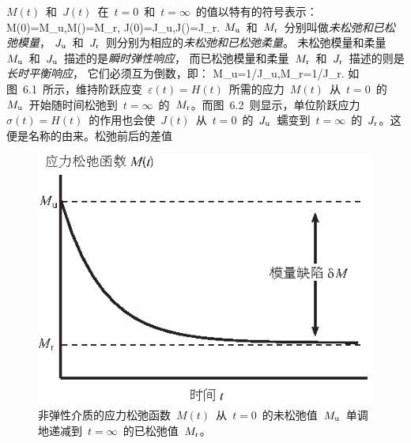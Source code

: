 $M(t)$~和~$J(t)$~在~$t=0$~和~$t=\infty$~的值以特有的符号表示：
\eq
M(0)=M_{\rm u},\qquad M(\infty)=M_{\rm r},
\en
\eq
J(0)=J_{\rm u},\qquad J(\infty)=J_{\rm r}.
\en
$M_{\rm u}$~和~$M_{\rm r}$~分别叫做{\em 未松弛和已松弛模量\/}，
%
%
%
%
$J_{\rm u}$~和~$J_{\rm r}$~则分别为相应的{\em 未松弛和已松弛柔量\/}。
%
%
%
%
未松弛模量和柔量~$M_{\rm u}$~和~$J_{\rm u}$~描述的是{\em 瞬时弹性响应\/}，
%
%
而已松弛模量和柔量~$M_{\rm r}$~和~$J_{\rm r}$~描述的则是{\em 长时平衡响应}，
%
%
它们必须互为倒数，即：
\eq
\label{6.recip}
M_{\rm u}=1/J_{\rm u},\qquad M_{\rm r}=1/J_{\rm r}.
\en
如图~6.1~所示，维持阶跃应变~$\varepsilon(t)=H(t)$~所需的应力~$M(t)$~从~$t=0$~的~$M_{\rm u}$~开始随时间松弛到~$t=\infty$~的~$M_{\rm r}$。而图~6.2~则显示，单位阶跃应力~$\sigma(t)=H(t)$~的作用也会使~$J(t)$~从~$t=0$~的~$J_{\rm u}$~蠕变到~$t=\infty$~的~$J_{\rm r}$。这便是名称的由来。松弛前后的差值
\begin{figure}
\begin{center}
\includegraphics{../figures/chap06/fig01.eps}
\end{center}
\caption[relaxation]{
非弹性介质的应力松弛函数~$M(t)$~从~$t=0$~的未松弛值~$M_{\rm u}$~单调地递减到~$t=\infty$~的已松弛值~$M_{\rm r}$。
}
\end{figure}
